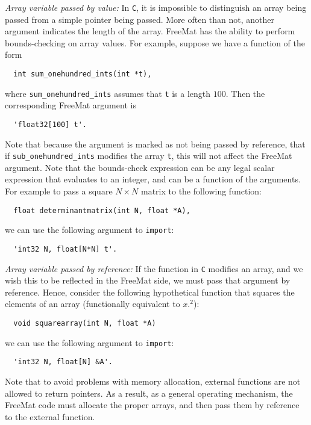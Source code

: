\emph{Array variable passed by value:}
In \verb|C|, it is impossible to distinguish an array being passed from
a simple pointer being passed.  More often than not, another argument
indicates the length of the array.  FreeMat has the ability to perform
bounds-checking on array values.  For example, suppose we have a function
of the form
\begin{verbatim}
  int sum_onehundred_ints(int *t),
\end{verbatim}
where \verb|sum_onehundred_ints| assumes that \verb|t| is a length $100$. 
Then the corresponding FreeMat argument is
\begin{verbatim}
  'float32[100] t'.
\end{verbatim}
Note that because the argument is marked as not being passed by reference,
that if \verb|sub_onehundred_ints| modifies the array \verb|t|, this
will not affect the FreeMat argument.  Note that the bounds-check expression
can be any legal scalar expression that evaluates to an integer, and can be
a function of the arguments.  For example to pass a square $N \times N$ 
matrix to the following function:
\begin{verbatim}
  float determinantmatrix(int N, float *A),
\end{verbatim}
we can use the following argument to \verb|import|:
\begin{verbatim}
  'int32 N, float[N*N] t'.
\end{verbatim}

\emph{Array variable passed by reference:}
If the function in \verb|C| modifies an array, and we wish this to be
reflected in the FreeMat side, we must pass that argument by reference.
Hence, consider the following hypothetical function that squares the
elements of an array (functionally equivalent to $x.^2$):
\begin{verbatim}
  void squarearray(int N, float *A)
\end{verbatim}
we can use the following argument to \verb|import|:
\begin{verbatim}
  'int32 N, float[N] &A'.
\end{verbatim}
Note that to avoid problems with memory allocation, external functions
are not allowed to return pointers.  As a result, as a general operating
mechanism, the FreeMat code must allocate the proper arrays, and then
pass them by reference to the external function.

